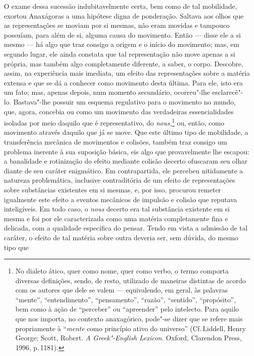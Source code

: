 O exame dessa sucessão indubitavelmente certa, bem como de tal mobilidade,
exortou Anaxágoras a uma hipótese digna de ponderação. Saltava aos olhos que
as representações se moviam por si mesmas, não eram movidas e tampouco
possuíam, para além de si, alguma causa do movimento. Então --- disse ele a si
mesmo --- há algo que traz consigo a origem e o início do movimento; mas, em
segundo lugar, ele ainda \label{aorigemeoinicio} constata que tal
representação não move apenas a si própria, mas \label{asipropria} também
algo completamente diferente, a saber, o corpo. Descobre, assim, na
experiência mais imediata, um efeito das representações sobre a matéria
extensa e que se dá a conhecer como movimento desta última. Para ele, isto
era um fato; mas, apenas depois, num momento secundário, ocorreu"-lhe
esclarecê"-lo. Bastava"-lhe possuir um esquema regulativo para o movimento no
mundo, que, agora, concebia ou como um movimento das verdadeiras
essencialidades isoladas por meio daquilo que é representativo, do \textit{nous},\footnote{No 
dialeto ático, quer como nome, quer como verbo, o termo
comporta diversas definições, sendo, de resto, utilizado de maneiras
distintas de acordo com os autores que dele se valem --- equivalendo, em
geral, às palavras ``mente'', ``entendimento'', ``pensamento'', ``razão'',
``sentido'', ``propósito'', bem como à ação de ``perceber'' ou ``apreender''
pelo intelecto. Para aquilo que nos importa, no contexto anaxagórico,
pode"-se dizer que se refere mais propriamente à ``\textit{mente} como
princípio ativo do universo'' (Cf.\,Liddell, Henry George; Scott,
Robert. \textit{A Greek"-English Lexicon}. Oxford, Clarendon Press, 1996,
p.\,1181).} ou, então, como movimento através daquilo que já se move. Que este
último tipo de mobilidade, a transferência mecânica de movimentos e colisões,
também traz consigo um problema inerente à sua suposição básica, eis algo que
provavelmente lhe escapou: a banalidade e rotinização do efeito mediante
colisão decerto ofuscaram seu olhar diante de seu caráter enigmático. Em
contrapartida, ele percebeu nitidamente a natureza problemática, inclusive
contraditória de um efeito de representações sobre substâncias existentes em
si mesmas, e, por isso, procurou remeter igualmente este efeito a eventos
mecânicos de impulsão e colisão que reputava inteligíveis. Em todo caso,
o \textit{nous} decerto era tal substância existente em si mesma e foi por
ele caracterizada como uma matéria completamente fina e delicada, com a
qualidade específica do pensar. Tendo em vista a admissão de tal caráter, o
efeito de tal matéria sobre outra deveria ser, sem dúvida, do mesmo tipo que
